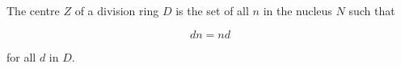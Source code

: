 The centre $Z$ of a division ring $D$ is the set of all $n$ in the nucleus $N$ such that

$$dn = nd$$

for all $d$ in $D$.

